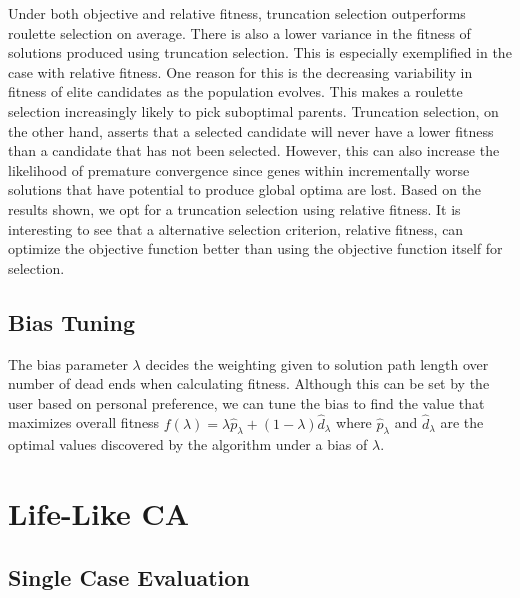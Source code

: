 Under both objective and relative fitness, truncation selection outperforms roulette selection on average. There is also a lower variance in the fitness of solutions produced using truncation selection. This is especially exemplified in the case with relative fitness. One reason for this is the decreasing variability in fitness of elite candidates as the population evolves. This makes a roulette selection increasingly likely to pick suboptimal parents. Truncation selection, on the other hand, asserts that a selected candidate will never have a lower fitness than a candidate that has not been selected. However, this can also increase the likelihood of premature convergence since genes within incrementally worse solutions that have potential to produce global optima are lost. Based on the results shown, we opt for a truncation selection using relative fitness. It is interesting to see that a alternative selection criterion, relative fitness, can optimize the objective function better than using the objective function itself for selection.

\subsection{Bias Tuning}
The bias parameter $\lambda$ decides the weighting given to solution path length over number of dead ends when calculating fitness. Although this can be set by the user based on personal preference, we can tune the bias to find the value that maximizes overall fitness  $f(\lambda) = \lambda \hat{p}_\lambda + (1-\lambda)\hat{d}_\lambda$ where $ \hat{p}_\lambda$ and $\hat{d}_\lambda$ are the optimal values discovered by the algorithm under a bias of $\lambda$.

\section{Life-Like CA}

\subsection{Single Case Evaluation} \label{sub:single-case}

